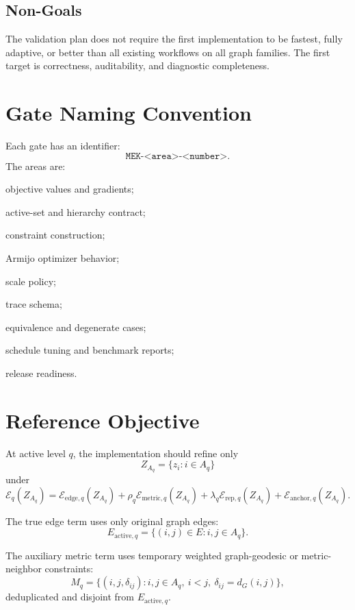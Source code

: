 \documentclass[11pt]{article}
\begin{document}
\subsection{Non-Goals}

The validation plan does not require the first implementation to be fastest,
fully adaptive, or better than all existing workflows on all graph families. The
first target is correctness, auditability, and diagnostic completeness.

\section{Gate Naming Convention}

Each gate has an identifier:
\[
  \texttt{MEK-<area>-<number>}.
\]
The areas are:
\begin{description}[leftmargin=2em]
  \item[OBJ] objective values and gradients;
  \item[MISF] active-set and hierarchy contract;
  \item[CON] constraint construction;
  \item[ARM] Armijo optimizer behavior;
  \item[SCL] scale policy;
  \item[TRC] trace schema;
  \item[EQV] equivalence and degenerate cases;
  \item[TUN] schedule tuning and benchmark reports;
  \item[REL] release readiness.
\end{description}

\section{Reference Objective}

At active level \(q\), the implementation should refine only
\[
  Z_{A_q} = \{z_i : i\in A_q\}
\]
under
\[
  \mathcal{E}_q(Z_{A_q})
  =
  \mathcal{E}_{\mathrm{edge},q}(Z_{A_q})
  +
  \rho_q \mathcal{E}_{\mathrm{metric},q}(Z_{A_q})
  +
  \lambda_q \mathcal{E}_{\mathrm{rep},q}(Z_{A_q})
  +
  \mathcal{E}_{\mathrm{anchor},q}(Z_{A_q}).
\]

The true edge term uses only original graph edges:
\[
  E_{\mathrm{active},q}
  =
  \{(i,j)\in E : i,j\in A_q\}.
\]

The auxiliary metric term uses temporary weighted graph-geodesic or
metric-neighbor constraints:
\[
  M_q =
  \{(i,j,\delta_{ij}) : i,j\in A_q,\ i<j,\ \delta_{ij}=d_G(i,j)\},
\]
deduplicated and disjoint from \(E_{\mathrm{active},q}\).
\end{document}
